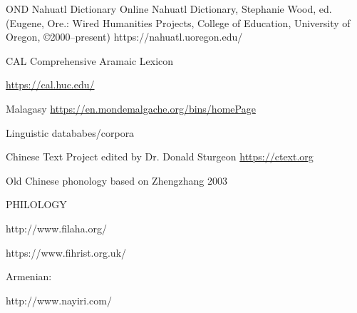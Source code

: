 OND Nahuatl Dictionary
Online Nahuatl Dictionary, Stephanie Wood, ed. (Eugene, Ore.: Wired Humanities Projects, College of Education, University of Oregon, ©2000–present)
https://nahuatl.uoregon.edu/
\parencite{wood_online_2000}

CAL Comprehensive Aramaic Lexicon

\url{https://cal.huc.edu/}

Malagasy
\url{https://en.mondemalgache.org/bins/homePage}


Linguistic datababes/corpora

Chinese Text Project edited by Dr. Donald Sturgeon \url{https://ctext.org}


Old Chinese phonology based on Zhengzhang 2003

PHILOLOGY

http://www.filaha.org/

https://www.fihrist.org.uk/

Armenian:

http://www.nayiri.com/








